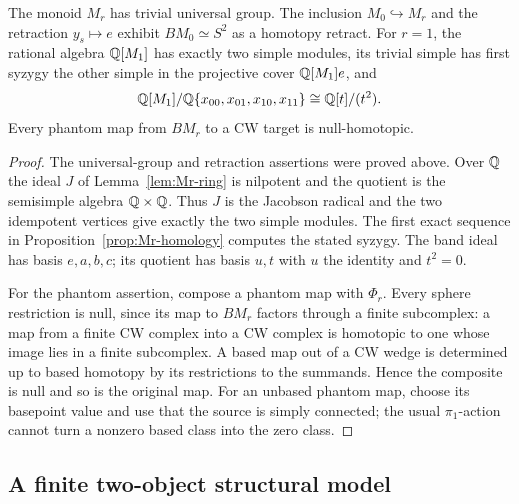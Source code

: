 \begin{proposition}\label{prop:Mr-auxiliary}
The monoid $M_r$ has trivial universal group.  The inclusion
$M_0\hookrightarrow M_r$ and the retraction $y_s\mapsto e$ exhibit
$BM_0\simeq S^2$ as a homotopy retract.  For $r=1$, the rational algebra
$\mathbb Q[M_1]$ has exactly two simple modules, its trivial simple has first
syzygy the other simple in the projective cover $\mathbb Q[M_1]e$, and
\[
 \mathbb Q[M_1]/\mathbb Q\{x_{00},x_{01},x_{10},x_{11}\}
       \cong\mathbb Q[t]/(t^2).
\]
Every phantom map from $BM_r$ to a CW target is null-homotopic.
\end{proposition}
\begin{proof}
The universal-group and retraction assertions were proved above.
Over $\mathbb Q$ the ideal $J$ of Lemma~\ref{lem:Mr-ring} is nilpotent and the
quotient is the semisimple algebra $\mathbb Q\times\mathbb Q$.  Thus $J$ is the
Jacobson radical and the two idempotent vertices give exactly the two
simple modules.  The first exact sequence in
Proposition~\ref{prop:Mr-homology} computes the stated syzygy.  The
band ideal has basis $e,a,b,c$; its quotient has basis $u,t$ with $u$
the identity and $t^2=0$.

For the phantom assertion, compose a phantom map with $\Phi_r$.
Every sphere restriction is null, since its map to $BM_r$ factors
through a finite subcomplex: a map from a finite CW complex into a CW
complex is homotopic to one whose image lies in a finite subcomplex.
A based map out of a CW wedge is determined up to based homotopy by
its restrictions to the summands.  Hence the composite is null and
so is the original map.  For an unbased phantom map, choose its
basepoint value and use that the source is simply connected; the
usual $\pi_1$-action cannot turn a nonzero based class into the zero
class.
\end{proof}

\subsection{A finite two-object structural model}

